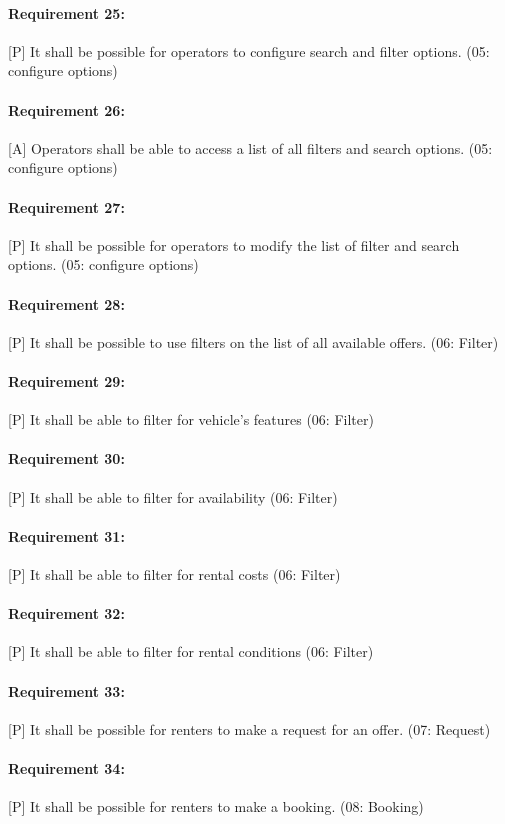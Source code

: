 \paragraph{Requirement 25:} [P] It shall be possible for operators to configure search and filter options. (05: configure options)
\paragraph{Requirement 26:} [A] Operators shall be able to access a list of all filters and search options. (05: configure options)
\paragraph{Requirement 27:} [P] It shall be possible for operators to modify the list of filter and search options. (05: configure options)

\paragraph{Requirement 28:} [P] It shall be possible to use filters on the list of all available offers. (06: Filter)
\paragraph{Requirement 29:} [P] It shall be able to filter for vehicle's features (06: Filter)
\paragraph{Requirement 30:} [P] It shall be able to filter for availability (06: Filter)
\paragraph{Requirement 31:} [P] It shall be able to filter for rental costs (06: Filter)
\paragraph{Requirement 32:} [P] It shall be able to filter for rental conditions (06: Filter)

\paragraph{Requirement 33:} [P] It shall be possible for renters to make a request for an offer. (07: Request)

\paragraph{Requirement 34:} [P] It shall be possible for renters to make a booking. (08: Booking)
